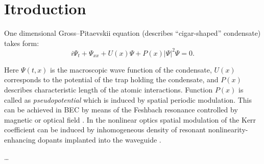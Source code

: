 
\chapter*{Itroduction}

One dimensional Gross--Pitaevskii equation (describes ``cigar-shaped'' condensate) takes form:
\begin{equation}
	i \Psi_t + \Psi_{xx} + U(x) \Psi + P(x) |\Psi|^2 \Psi = 0.
\label{eq:gross-pitaevskii}
\end{equation}

Here $\Psi(t, x)$ is the macroscopic wave function of the condensate, $U(x)$ corresponds to the potential of the trap holding the condensate, and $P(x)$ describes characteristic length of the atomic interactions.
Function $P(x)$ is called as {\it pseudopotential} which is induced by spatial periodic modulation.
This can be achieved in BEC by means of the Feshbach resonance controlled by magnetic or optical field \cite{PollackDriesJunkerChenCorcovilosHulet, ChinGrimmJulienneTsienga, BauerLetterVoRempeDurr}.
In the nonlinear optics spatial modulation of the Kerr coefficient can be induced by inhomogeneous density of resonant nonlinearity-enhancing dopants implanted into the waveguide \cite{HukriedeRundeKip}.

\dots

